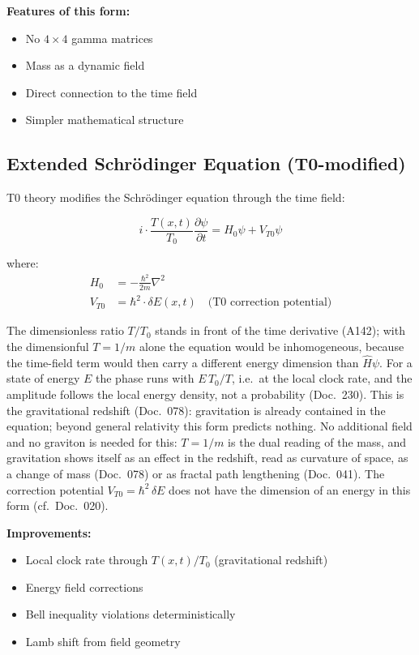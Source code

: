 	\textbf{Features of this form:}
	\begin{itemize}
		\item No $4 \times 4$ gamma matrices
		\item Mass as a dynamic field
		\item Direct connection to the time field
		\item Simpler mathematical structure
	\end{itemize}
	
	\subsection{Extended Schrödinger Equation (T0-modified)}
	
	T0 theory modifies the Schrödinger equation through the time field:
	
	\begin{t0box}
		\begin{equation}
			i \cdot \frac{T(x,t)}{T_0} \frac{\partial\psi}{\partial t} = H_0 \psi + V_{T0} \psi
		\end{equation}
		
		where:
		\begin{align}
			H_0 &= -\frac{\hbar^2}{2m} \nabla^2 \\
			V_{T0} &= \hbar^2 \cdot \delta E(x,t) \quad \text{(T0 correction potential)}
		\end{align}
	\end{t0box}
	The dimensionless ratio $T/T_0$ stands in front of the time derivative (A142); with the dimensionful $T=1/m$ alone the equation would be inhomogeneous, because the time-field term would then carry a different energy dimension than $\hat H\psi$. For a state of energy $E$ the phase runs with $E\,T_0/T$, i.e.\ at the local clock rate, and the amplitude follows the local energy density, not a probability (Doc.~230). This is the gravitational redshift (Doc.~078): gravitation is already contained in the equation; beyond general relativity this form predicts nothing. No additional field and no graviton is needed for this: $T=1/m$ is the dual reading of the mass, and gravitation shows itself as an effect in the redshift, read as curvature of space, as a change of mass (Doc.~078) or as fractal path lengthening (Doc.~041). The correction potential $V_{T0}=\hbar^2\,\delta E$ does not have the dimension of an energy in this form (cf.\ Doc.~020).
	
	\textbf{Improvements:}
	\begin{itemize}
		\item Local clock rate through $T(x,t)/T_0$ (gravitational redshift)
		\item Energy field corrections
		\item Bell inequality violations deterministically
		\item Lamb shift from field geometry
	\end{itemize}
	

